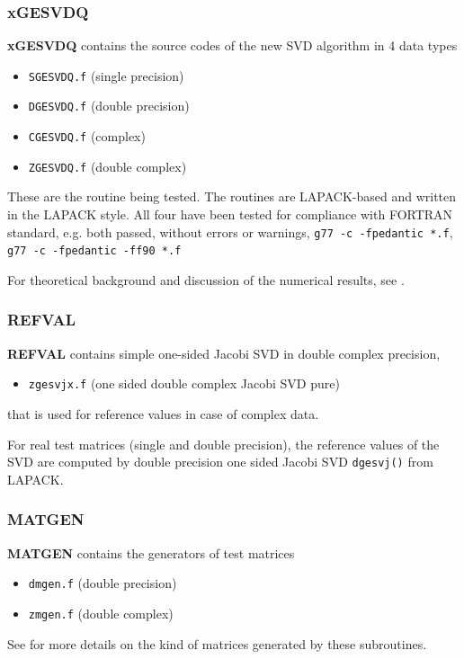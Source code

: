 \documentclass[12pt, a4paper, final]{article}
\numberwithin{equation}{section}
\begin{document}
\subsubsection{xGESVDQ}
\textbf{xGESVDQ}  contains the source codes of the new SVD
algorithm in 4 data types
\begin{itemize}
\item \texttt{SGESVDQ.f} (single precision)
\item \texttt{DGESVDQ.f} (double precision)
\item \texttt{CGESVDQ.f} (complex)
\item \texttt{ZGESVDQ.f} (double complex)
\end{itemize}
These are the routine being tested. 
The routines are LAPACK-based and written in the LAPACK style. All four have been tested for compliance with FORTRAN standard, e.g. both
passed, without errors or warnings, \texttt{g77 -c -fpedantic *.f}, \texttt{g77 -c -fpedantic -ff90 *.f}

\noindent For theoretical background and  discussion of the numerical results, see \cite{drm-xgesvd-paper}.

\subsubsection{REFVAL}
\textbf{REFVAL}  contains simple one-sided
Jacobi SVD in double complex precision,
\begin{itemize}
\item \texttt{zgesvjx.f} (one sided double complex Jacobi SVD pure)
\end{itemize}
that is used for reference values in case of complex data.

\noindent For real test matrices (single and double precision), the reference values of the SVD are computed by double precision one sided Jacobi SVD \texttt{dgesvj()} from LAPACK. 

\subsubsection{MATGEN}
\textbf{MATGEN} contains the generators of test matrices
\begin{itemize}
\item \texttt{dmgen.f} (double precision)
\item \texttt{zmgen.f} (double complex)
\end{itemize}
See \cite[\S 3.1]{drm-xgesvd-paper} for more details on the kind of matrices
generated by these subroutines.
\end{document}
